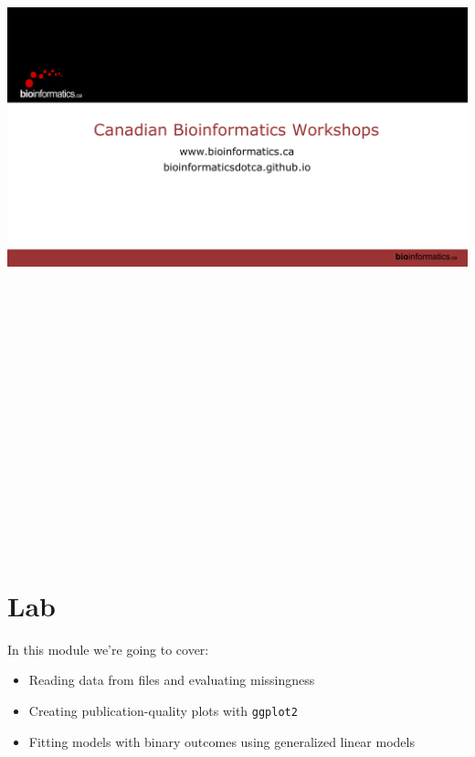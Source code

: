 \documentclass[
]{book}
\providecommand{\tightlist}{%
  \setlength{\itemsep}{0pt}\setlength{\parskip}{0pt}}
\begin{document}
\includegraphics[width=1\textwidth,height=9.375in]{content-files/module-3-lecture.pdf}\\

\section{Lab}\label{lab-2}

In this module we're going to cover:

\begin{itemize}
\tightlist
\item
  Reading data from files and evaluating missingness
\item
  Creating publication-quality plots with \texttt{ggplot2}
\item
  Fitting models with binary outcomes using generalized linear models
\end{itemize}
\end{document}
